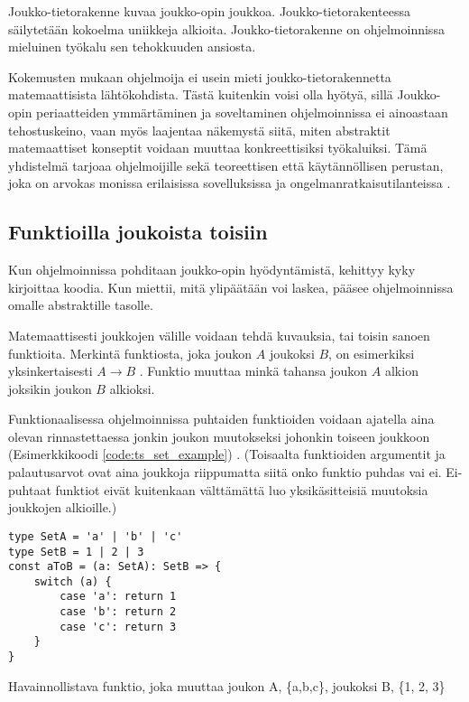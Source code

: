 Joukko-tietorakenne kuvaa joukko-opin joukkoa. Joukko-tietorakenteessa säilytetään kokoelma uniikkeja alkioita. Joukko-tietorakenne on ohjelmoinnissa mieluinen työkalu sen tehokkuuden ansiosta. \citep{ecma_spec}

Kokemusten mukaan ohjelmoija ei usein mieti joukko-tietorakennetta matemaattisista lähtökohdista. Tästä kuitenkin voisi olla hyötyä, sillä Joukko-opin periaatteiden ymmärtäminen ja soveltaminen ohjelmoinnissa ei ainoastaan tehostuskeino, vaan myös laajentaa näkemystä siitä, miten abstraktit matemaattiset konseptit voidaan muuttaa konkreettisiksi työkaluiksi. Tämä yhdistelmä tarjoaa ohjelmoijille sekä teoreettisen että käytännöllisen perustan, joka on arvokas monissa erilaisissa sovelluksissa ja ongelmanratkaisutilanteissa \cite{bartosz_category_for_progamers}.

\subsection{Funktioilla joukoista toisiin}
Kun ohjelmoinnissa pohditaan joukko-opin hyödyntämistä, kehittyy  kyky kirjoittaa koodia. Kun miettii, mitä ylipäätään voi laskea, pääsee ohjelmoinnissa omalle abstraktille tasolle. \citep{Tan2004,BlellochHarper2015}

Matemaattisesti joukkojen välille voidaan tehdä kuvauksia, tai toisin sanoen funktioita. Merkintä funktiosta, joka  joukon $A$ joukoksi $B$, on esimerkiksi yksinkertaisesti $A \to B$ \cite{mellin2005joukkooppi}. Funktio muuttaa minkä tahansa joukon $A$ alkion joksikin joukon $B$ alkioksi.

Funktionaalisessa ohjelmoinnissa puhtaiden funktioiden voidaan ajatella aina olevan rinnastettaessa jonkin joukon muutokseksi johonkin toiseen joukkoon (Esimerkkikoodi \ref{code:ts_set_example}) \cite{bartosz_category_for_progamers}. (Toisaalta funktioiden argumentit ja palautusarvot ovat aina joukkoja riippumatta siitä onko funktio puhdas vai ei. Ei-puhtaat funktiot eivät kuitenkaan välttämättä luo yksikäsitteisiä muutoksia joukkojen alkioille.)

\begin{code}
    \begin{verbatim}
type SetA = 'a' | 'b' | 'c'
type SetB = 1 | 2 | 3
const aToB = (a: SetA): SetB => {
    switch (a) {
        case 'a': return 1
        case 'b': return 2
        case 'c': return 3
    }
}  
\end{verbatim}
    \caption{Havainnollistava funktio, joka muuttaa joukon A, \{a,b,c\}, joukoksi B, \{1, 2, 3\}}
    \label{code:ts_set_example}
\end{code}

